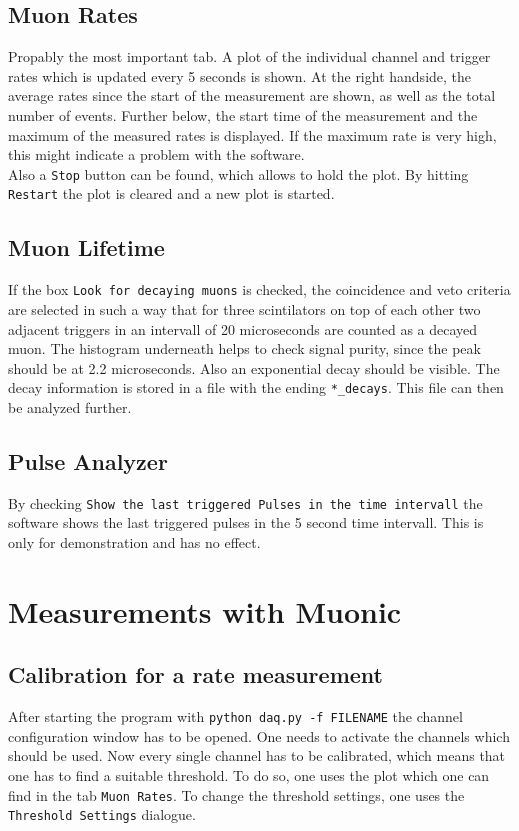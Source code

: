 \documentclass[a4paper,12pt]{article}
\begin{document}
\subsection{Muon Rates}
Propably the most important tab. A plot of the individual channel and trigger rates which is updated every 5 seconds is shown. At the right handside, the average rates since the start of the measurement are shown, as well as the total number of events. Further below, the start time of the measurement and the maximum of the measured rates is displayed. If the maximum rate is very high, this might indicate a problem with the software.\\
Also a \verb|Stop| button can be found, which allows to hold the plot. By hitting \verb|Restart| the plot is cleared and a new plot is started.
\subsection{Muon Lifetime}
If the box \verb|Look for decaying muons| is checked, the coincidence and veto criteria are selected in such a way that for three scintilators on top of each other two adjacent triggers in an intervall of 20 microseconds are counted as a decayed muon.
The histogram underneath helps to check signal purity, since the peak should be at 2.2 microseconds. Also an exponential decay should be visible.
The decay information is stored in a file with the ending \verb|*_decays|. This file can then be analyzed further.
\subsection{Pulse Analyzer}
By checking \verb|Show the last triggered Pulses in the time intervall| 
the software shows the last triggered pulses in the 5 second time intervall. This is only for demonstration and has no effect.
\section{Measurements with Muonic}
\subsection{Calibration for a rate measurement}


After starting the program with \verb|python daq.py -f FILENAME| the channel configuration window has to be opened. One needs to activate the channels which should be used. Now every single channel has to be calibrated, which means that one has to find a suitable threshold. To do so, one uses the plot which one can find in the tab \verb|Muon Rates|. To change the threshold settings, one uses the \verb|Threshold Settings| dialogue.\\
\end{document}
